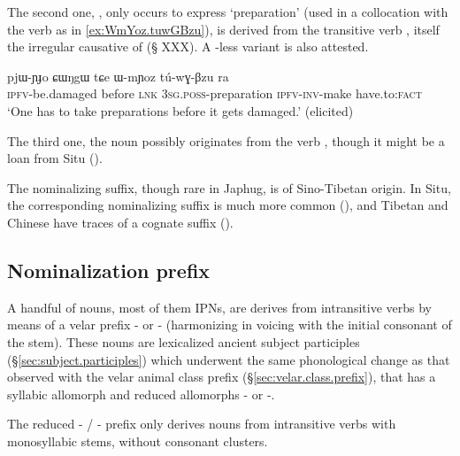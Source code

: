 The second one, , only occurs to express `preparation' (used in a collocation with the verb  as in \ref{ex:WmYoz.tuwGBzu}), is derived from the transitive verb , itself the irregular causative of  (§ XXX). A -less variant  is also attested.

\begin{exe}
\ex \label{ex:WmYoz.tuwGBzu}
\gll  pjɯ-ɲɟo ɕɯŋgɯ tɕe ɯ-mɲoz tú-wɣ-βzu ra \\
\textsc{ipfv}-be.damaged before \textsc{lnk} \textsc{3sg}.\textsc{poss}-preparation \textsc{ipfv}-\textsc{inv}-make have.to:\textsc{fact} \\
\glt `One has to take preparations before it gets damaged.' (elicited)
\end{exe}

The third one, the noun  possibly originates from the verb , though it might be a loan from Situ (\citealt{jacques03s.houzhui}). 

The  nominalizing suffix, though rare in Japhug, is of Sino-Tibetan origin. In Situ, the corresponding nominalizing  suffix is much more common (\citealt{jacques03s.houzhui}), and Tibetan and Chinese have traces of a cognate suffix (\citealt{jacques16ssuffixes}).


\subsection{Nominalization  prefix} \label{sec:G.nmlz}
A handful of nouns, most of them IPNs, are derives from intransitive verbs by means of a velar prefix  - or - (harmonizing in voicing with the initial consonant of the stem). These nouns are lexicalized ancient subject participles (§\ref{sec:subject.participles}) which underwent the same phonological change as that observed with the velar animal class prefix (§\ref{sec:velar.class.prefix}), that has a syllabic allomorph  and reduced allomorphs - or -. 

The reduced - / - prefix only derives nouns from intransitive verbs with monosyllabic stems, without consonant clusters. 



